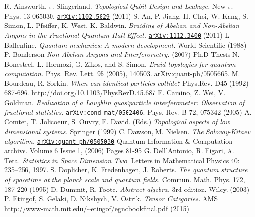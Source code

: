 


\begin{thebibliography}{99}
 R. Ainsworth, J. Slingerland. \textit{Topological Qubit Design and Leakage.} New J. Phys. 13 065030. \href{https://arxiv.org/abs/1102.5029}{\texttt{arXiv:1102.5029}} (2011)
 S. An, P. Jiang, H. Choi, W. Kang, S. Simon, L. Pfeiffer, K. West, K. Baldwin. \textit{Braiding of Abelian and Non-Abelian Anyons in the Fractional Quantum Hall Effect.} \href{https://arxiv.org/abs/1112.3400}{\texttt{arXiv:1112.3400}} (2011)
 L. Ballentine. \textit{Quantum mechanics: A modern development.} World Scientific (1988)
 P. Bonderson \textit{Non-Abelian Anyons and Interferometry.} (2007) Ph.D Thesis
 N. Bonesteel, L. Hormozi, G. Zikos, and S. Simon. \textit{Braid topologies for quantum computation.} Phys. Rev. Lett. 95 (2005), 140503. arXiv:quant-ph/0505665.
 M. Bourdeau, R. Sorkin. \textit{When can identical particles collide?} Phys.Rev. D45 (1992) 687-696. \url{http://doi.org/10.1103/PhysRevD.45.687}
 F. Camino, Z. Wei, V. Goldman. \textit{Realization of a Laughlin quasiparticle interferometer: Observation of fractional statistics.} \texttt{arXiv:cond-mat/0502406}. Phys. Rev. B 72, 075342 (2005)
 A. Comtet, T. Jolicoeur, S. Ouvry, F. David. (Eds.) \textit{Topological aspects of low dimensional systems.} Springer (1999)
 C. Dawson, M. Nielsen. \textit{The Solovay-Kitaev algorithm.} \href{https://arxiv.org/abs/quant-ph/0505030}{\texttt{arXiv:quant-ph/0505030}} Quantum Information \& Computation archive. Volume 6 Issue 1, (2006) Pages 81-95
 G. Dell'Antonio, R. Figari, A. Teta. \textit{Statistics in Space Dimension Two.} Letters in Mathematical Physics 40: 235–256, 1997.
 S. Doplicher, K. Fredenhagen, J. Roberts. \textit{The quantum structure of spacetime at the planck scale and quantum fields.} Commun. Math. Phys. 172, 187-220 (1995)
 D. Dummit, R. Foote. \textit{Abstract algebra.} 3rd edition. Wiley. (2003)
 P. Etingof, S. Gelaki, D. Nikshych, V. Ostrik. \textit{Tensor Categories.} AMS \url{http://www-math.mit.edu/~etingof/egnobookfinal.pdf} (2015)

\end{thebibliography}
